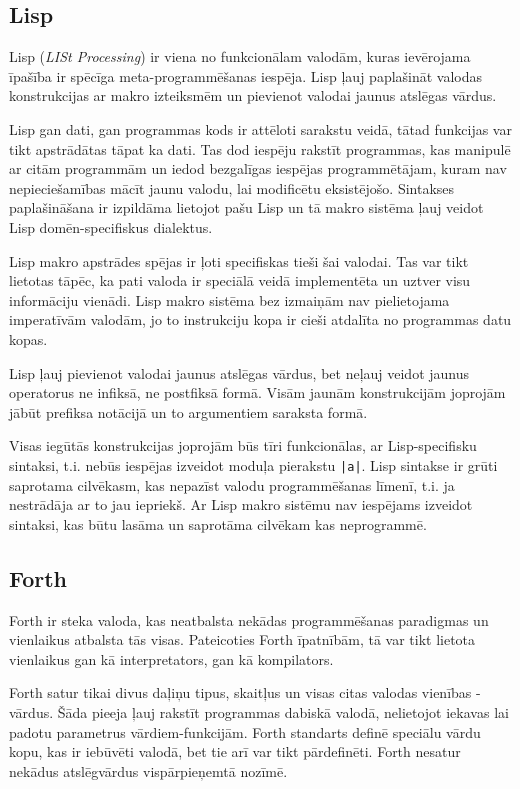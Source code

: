 \subsection{\label{sbs:rel_lisp}Lisp}

Lisp (\emph{LISt Processing}) ir viena no funkcionālam valodām, kuras ievērojama īpašība ir spēcīga meta-programmēšanas iespēja. Lisp ļauj paplašināt valodas konstrukcijas ar makro izteiksmēm un pievienot valodai jaunus atslēgas vārdus.

Lisp gan dati, gan programmas kods ir attēloti sarakstu veidā, tātad funkcijas var tikt apstrādātas tāpat ka dati. Tas dod iespēju rakstīt programmas, kas manipulē ar citām programmām un iedod bezgalīgas iespējas programmētājam, kuram nav nepieciešamības mācīt jaunu valodu, lai modificētu eksistējošo. Sintakses paplašināšana ir izpildāma lietojot pašu Lisp un tā makro sistēma ļauj veidot Lisp domēn-specifiskus dialektus.

Lisp makro apstrādes spējas ir ļoti specifiskas tieši šai valodai. Tas var tikt lietotas tāpēc, ka pati valoda ir speciālā veidā implementēta un uztver visu informāciju vienādi. Lisp makro sistēma bez izmaiņām nav pielietojama imperatīvām valodām, jo to instrukciju kopa ir cieši atdalīta no programmas datu kopas.

Lisp ļauj pievienot valodai jaunus atslēgas vārdus, bet neļauj veidot jaunus operatorus ne infiksā, ne postfiksā formā. Visām jaunām konstrukcijām joprojām jābūt prefiksa notācijā un to argumentiem saraksta formā.

Visas iegūtās konstrukcijas joprojām būs tīri funkcionālas, ar Lisp-specifisku sintaksi, t.i. nebūs iespējas izveidot moduļa pierakstu \verb/|a|/. Lisp sintakse ir grūti saprotama cilvēkasm, kas nepazīst valodu programmēšanas līmenī, t.i. ja nestrādāja ar to jau iepriekš. Ar Lisp makro sistēmu nav iespējams izveidot sintaksi, kas būtu lasāma un saprotāma cilvēkam kas neprogrammē.

\cite{Seibel:PracticalCommonLisp}

\subsection{\label{sbs:rel_forth}Forth}

Forth ir steka valoda, kas neatbalsta nekādas programmēšanas paradigmas un vienlaikus atbalsta tās visas. Pateicoties Forth īpatnībām, tā var tikt lietota vienlaikus gan kā interpretators, gan kā kompilators.

Forth satur tikai divus daļiņu tipus, skaitļus un visas citas valodas vienības - vārdus. Šāda pieeja ļauj rakstīt programmas dabiskā valodā, nelietojot iekavas lai padotu parametrus vārdiem-funkcijām. Forth standarts definē speciālu vārdu kopu, kas ir iebūvēti valodā, bet tie arī var tikt pārdefinēti. Forth nesatur nekādus atslēgvārdus vispārpieņemtā nozīmē.

